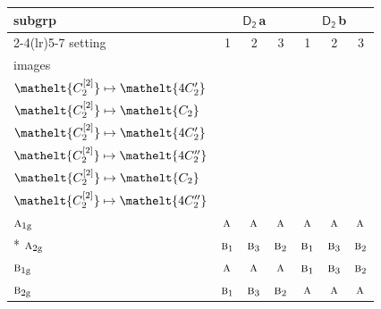 \documentclass[10pt,a4paper]{article}
\numberwithin{equation}{section}
\newcommand{\eltfont}[1]{{\let\sigma\eltsigma\mathelt{#1}}}
\newcommand{\grp}[1]{\mathsf{#1}}
\newcommand{\irr}[1]{\text{\normalfont\scshape #1}}
\newcommand{\cls}[1]{\eltfont{#1}}
\newcommand{\ptag}[1]{\mathrm{#1}}
\newcommand{\clsletter}[1]{\,{\scriptsize\color{black!55}#1}}
\newcommand{\genidx}[2]{#1^{[\mathrm{#2}]}}
\begin{document}
{\small\begin{longtable}{@{}lcccccc@{}}\toprule
subgrp & \multicolumn{3}{c}{\href{D2.pdf}{$\grp{D_{2}}$}\clsletter{a}} & \multicolumn{3}{c}{\href{D2.pdf}{$\grp{D_{2}}$}\clsletter{b}}\\\cmidrule(lr){2-4}\cmidrule(lr){5-7}
setting & 1 & 2 & 3 & 1 & 2 & 3\\
images & {\scriptsize\begin{tabular}[t]{@{}c@{}}$\cls{\genidx{C_{2}}{1}} \mapsto \cls{C_{2}}$\\$\cls{\genidx{C_{2}}{2}} \mapsto \cls{4C_{2}'}$\end{tabular}} & {\scriptsize\begin{tabular}[t]{@{}c@{}}$\cls{\genidx{C_{2}}{1}} \mapsto \cls{4C_{2}'}$\\$\cls{\genidx{C_{2}}{2}} \mapsto \cls{C_{2}}$\end{tabular}} & {\scriptsize\begin{tabular}[t]{@{}c@{}}$\cls{\genidx{C_{2}}{1}} \mapsto \cls{4C_{2}'}$\\$\cls{\genidx{C_{2}}{2}} \mapsto \cls{4C_{2}'}$\end{tabular}} & {\scriptsize\begin{tabular}[t]{@{}c@{}}$\cls{\genidx{C_{2}}{1}} \mapsto \cls{C_{2}}$\\$\cls{\genidx{C_{2}}{2}} \mapsto \cls{4C_{2}''}$\end{tabular}} & {\scriptsize\begin{tabular}[t]{@{}c@{}}$\cls{\genidx{C_{2}}{1}} \mapsto \cls{4C_{2}''}$\\$\cls{\genidx{C_{2}}{2}} \mapsto \cls{C_{2}}$\end{tabular}} & {\scriptsize\begin{tabular}[t]{@{}c@{}}$\cls{\genidx{C_{2}}{1}} \mapsto \cls{4C_{2}''}$\\$\cls{\genidx{C_{2}}{2}} \mapsto \cls{4C_{2}''}$\end{tabular}}\\\midrule\endhead
\bottomrule\endfoot\endlastfoot
$\irr{a}_{1\ptag{g}}$ & $\irr{a}$ & $\irr{a}$ & $\irr{a}$ & $\irr{a}$ & $\irr{a}$ & $\irr{a}$\\*
$\irr{a}_{2\ptag{g}}$ & $\irr{b}_{1}$ & $\irr{b}_{3}$ & $\irr{b}_{2}$ & $\irr{b}_{1}$ & $\irr{b}_{3}$ & $\irr{b}_{2}$\\
$\irr{b}_{1\ptag{g}}$ & $\irr{a}$ & $\irr{a}$ & $\irr{a}$ & $\irr{b}_{1}$ & $\irr{b}_{3}$ & $\irr{b}_{2}$\\
$\irr{b}_{2\ptag{g}}$ & $\irr{b}_{1}$ & $\irr{b}_{3}$ & $\irr{b}_{2}$ & $\irr{a}$ & $\irr{a}$ & $\irr{a}$\\

\end{longtable}}
\end{document}
